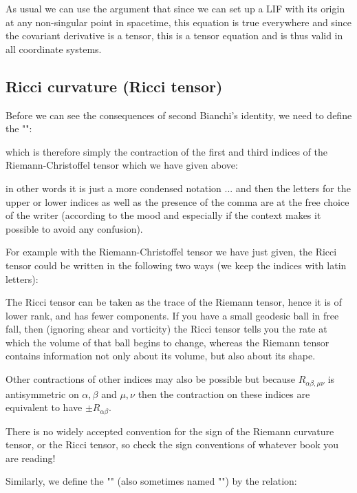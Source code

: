 	As usual we can use the argument that since we can set up a LIF with its origin at any non-singular point in spacetime, this equation is true everywhere and since the covariant derivative is a tensor, this is a tensor equation and is thus valid in all coordinate systems.
	
	
	\subsection{Ricci curvature (Ricci tensor)}\label{Ricci tensor}
	Before we can see the consequences of second Bianchi's identity, we need to define the "":
	
	which is therefore simply the contraction of the first and third indices of the Riemann-Christoffel tensor which we have given above:
	
	in other words it is just a more condensed notation ... and then the letters for the upper or lower indices as well as the presence of the comma are at the free choice of the writer (according to the mood and especially if the context makes it possible to avoid any confusion).

	For example with the Riemann-Christoffel tensor we have just given, the Ricci tensor could be written in the following two ways (we keep the indices with latin letters):
	
	The Ricci tensor can be taken as the trace of the Riemann tensor, hence it is of lower rank, and has fewer components. If you have a small geodesic ball in free fall, then (ignoring shear and vorticity) the Ricci tensor tells you the rate at which the volume of that ball begins to change, whereas the Riemann tensor contains information not only about its volume, but also about its shape. 
	
	Other contractions of other indices may also be possible but because $R_{\alpha\beta,\mu\nu}$ is antisymmetric on $\alpha,\beta$ and $\mu,\nu$ then the contraction on these indices are equivalent to have $\pm R_{\alpha\beta}$.
	\begin{tcolorbox}[title=Remark,colframe=black,arc=10pt]
	There is no widely accepted convention for the sign of the Riemann
curvature tensor, or the Ricci tensor, so check the sign conventions of whatever book you are reading!
	\end{tcolorbox}
	Similarly, we define the "\label{ricci scalar}" (also sometimes named "") by the relation:
	
